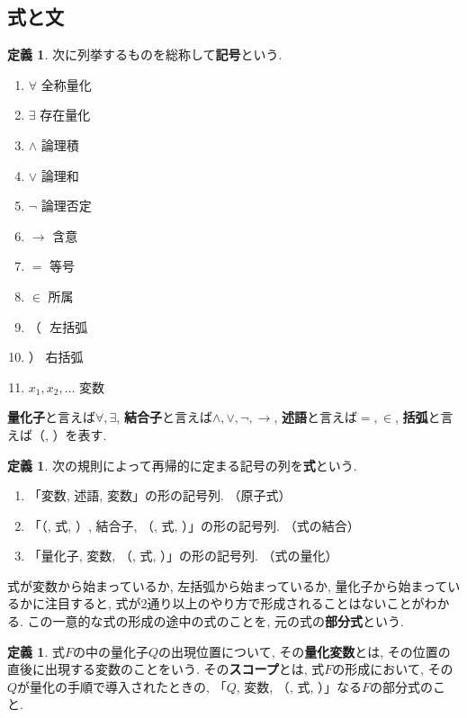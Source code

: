 \documentclass[a4paper]{bxjsarticle}
\theoremstyle{definition}
\newtheorem{defn}[thm]{定義}
\begin{document}
    \subsection{式と文}
    \begin{defn}
        次に列挙するものを総称して\textbf{記号}という.
        \begin{enumerate}
            \item $\forall$ 全称量化
            \item $\exists$ 存在量化
            \item $\land$ 論理積
            \item $\lor$ 論理和
            \item $\lnot$ 論理否定
            \item $\to$ 含意
            \item $=$ 等号
            \item $\in$ 所属
            \item  （ \,\,左括弧
            \item  ） 右括弧
            \item $x_1, x_2, \dots$ 変数
        \end{enumerate}
        \textbf{量化子}と言えば$\forall, \exists$, \textbf{結合子}と言えば$\land, \lor, \lnot, \to$, \textbf{述語}と言えば$=, \in$, \textbf{括弧}と言えば（, ）を表す.
    \end{defn}
    \begin{defn}    
        次の規則によって再帰的に定まる記号の列を\textbf{式}という.
        \begin{enumerate}
            \item 「変数, 述語, 変数」の形の記号列. （原子式）
            \item 「（, 式, ）, 結合子, （, 式, ）」の形の記号列. （式の結合）
            \item 「量化子, 変数, （, 式, ）」の形の記号列. （式の量化）
        \end{enumerate}
        式が変数から始まっているか, 左括弧から始まっているか, 量化子から始まっているかに注目すると, 式が2通り以上のやり方で形成されることはないことがわかる. この一意的な式の形成の途中の式のことを, 元の式の\textbf{部分式}という.
    \end{defn}
    \begin{defn}
        式$F$の中の量化子$Q$の出現位置について, その\textbf{量化変数}とは, その位置の直後に出現する変数のことをいう.  その\textbf{スコープ}とは, 式$F$の形成において, その$Q$が量化の手順で導入されたときの, 「$Q$, 変数, （, 式, ）」なる$F$の部分式のこと.
    \end{defn}
\end{document}
